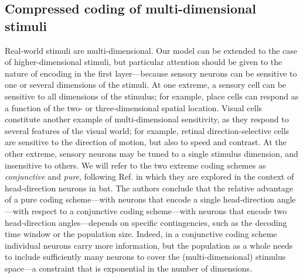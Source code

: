 \documentclass[a4paper]{article}%
\begin{document}
\subsection{Compressed coding of multi-dimensional stimuli}

Real-world stimuli are multi-dimensional. Our model can be extended to the
case of higher-dimensional stimuli, but particular attention should be given
to the nature of encoding in the first layer---because sensory neurons can be
sensitive to one or several dimensions of the stimuli. At one extreme, a
sensory cell can be sensitive to all dimensions of the stimulus; for example,
place cells can respond as a function of the two- or three-dimensional spatial
location. Visual cells constitute another example of multi-dimensional
sensitivity, as they respond to several features of the visual world; for
example, retinal direction-selective cells are sensitive to the direction of
motion, but also to speed and contrast. At the other extreme, sensory neurons
may be tuned to a single stimulus dimension, and insensitive to others. We
will refer to the two extreme coding schemes as \textit{conjunctive} and
\textit{pure}, following Ref. \cite{Finkelstein2018OptimalBats} in which they
are explored in the context of head-direction neurons in bat. The authors
conclude that the relative advantage of a pure coding scheme---with neurons
that encode a single head-direction angle---with respect to a conjunctive
coding scheme---with neurons that encode two head-direction angles---depends
on specific contingencies, such as the decoding time window or the population
size. Indeed, in a conjunctive coding scheme individual neurons carry more
information, but the population as a whole needs to include sufficiently many
neurons to cover the (multi-dimensional) stimulus space---a constraint that is
exponential in the number of dimensions.
\end{document}
